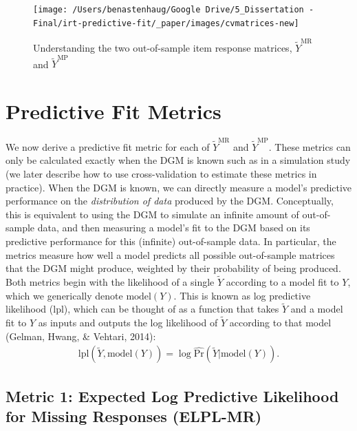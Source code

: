 \documentclass[
  english,
  man,floatsintext]{apa7}
\begin{document}
\begin{figure}

{\centering \texttt{[image: /Users/benastenhaug/Google Drive/5\_Dissertation - Final/irt-predictive-fit/\_paper/images/cvmatrices-new]} 

}

\caption{Understanding the two out-of-sample item response matrices, $\tilde Y^{\text{MR}}$ and $\tilde Y^{\text{MP}}$}\label{fig:elpl}
\end{figure}

\hypertarget{pfm}{%
\section{Predictive Fit Metrics}\label{pfm}}

We now derive a predictive fit metric for each of \(\tilde Y^{\text{MR}}\) and \(\tilde Y^{\text{MP}}\). These metrics can only be calculated exactly when the DGM is known such as in a simulation study (we later describe how to use cross-validation to estimate these metrics in practice). When the DGM is known, we can directly measure a model's predictive performance on the \emph{distribution of data} produced by the DGM. Conceptually, this is equivalent to using the DGM to simulate an infinite amount of out-of-sample data, and then measuring a model's fit to the DGM based on its predictive performance for this (infinite) out-of-sample data. In particular, the metrics measure how well a model predicts all possible out-of-sample matrices that the DGM might produce, weighted by their probability of being produced. Both metrics begin with the likelihood of a single \(\tilde{Y}\) according to a model fit to \(Y\), which we generically denote \(\text{model}(Y)\). This is known as log predictive likelihood (lpl), which can be thought of as a function that takes \(\tilde Y\) and a model fit to \(Y\) as inputs and outputs the log likelihood of \(\tilde Y\) according to that model (Gelman, Hwang, \& Vehtari, 2014):
\begin{align}
\text{lpl}(\tilde{Y}, \text{model}(Y))  = \log \hat{\text{Pr}}(\tilde{Y} | \text{model}(Y)).
\end{align}

\hypertarget{metric-1-expected-log-predictive-likelihood-for-missing-responses-elpl-mr}{%
\subsection{Metric 1: Expected Log Predictive Likelihood for Missing Responses (ELPL-MR)}\label{metric-1-expected-log-predictive-likelihood-for-missing-responses-elpl-mr}}
\end{document}
